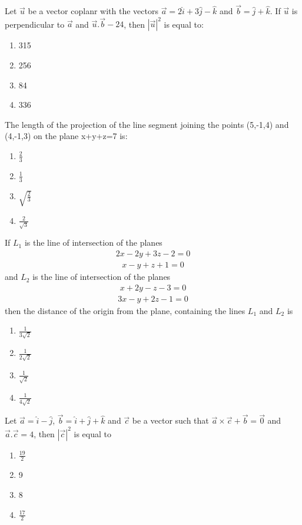 \item Let $\overrightarrow{u}$ be a vector coplanr with the vectors $\overrightarrow{a}=2\hat{i}+3\hat{j}-\hat{k}$ and 
$\overrightarrow{b}=\hat{j}+\hat{k}$. If $\overrightarrow{u}$ is perpendicular to $\overrightarrow{a}$ and $\overrightarrow{u}.\overrightarrow{b}-24$, then $|\overrightarrow{u}|^2$ is equal to:
\begin{enumerate}
\item 315
\item 256
\item 84
\item 336
\end{enumerate} 

\item The length of the projection of the line segment joining the points (5,-1,4) and (4,-1,3) on the plane x+y+z=7 is:
\begin{enumerate}
\item $\frac{2}{3}$
\item $\frac{1}{3}$
\item $\sqrt{\frac{2}{3}}$
\item $\frac{2}{\sqrt{3}}$
\end{enumerate}

\item If $L_1$ is the line of intersection of the planes
\begin{align*}
2x-2y+3z-2=0
\end{align*}
\begin{align*}
x-y+z+1=0
\end{align*}
and $L_2$ is the line of intersection of the planes
\begin{align*}
x+2y-z-3=0
\end{align*}
\begin{align*}
3x-y+2z-1=0
\end{align*}
then the distance of the origin from the plane, containing the lines $L_1$ and $L_2$ is
\begin{enumerate}
\item $\frac{1}{3\sqrt{2}}$
\item $\frac{1}{2\sqrt{2}}$
\item $\frac{1}{\sqrt{2}}$
\item $\frac{1}{4\sqrt{2}}$
\end{enumerate}

\item Let $\overrightarrow{a}=\hat{i}-\hat{j}$, $\overrightarrow{b}=\hat{i}+\hat{j}+\hat{k}$  and $\overrightarrow{c}$ be a vector such that $\overrightarrow{a} \times \overrightarrow{c}+\overrightarrow{b}=\overrightarrow{0}$ and $\overrightarrow{a}.\overrightarrow{c}=4$, then $|\overrightarrow{c}|^2$ is equal to
\begin{enumerate}
\item $\frac{19}{2}$
\item 9
\item 8
\item $\frac{17}{2}$
\end{enumerate}

